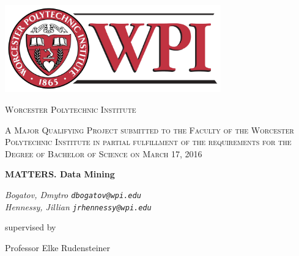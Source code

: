 \begin{titlepage}
	\centering
	
    \includegraphics[width=0.7\textwidth]{images/wpiLogo.png}\par\vspace{0.5cm}
	
    {\scshape\Large Worcester Polytechnic Institute \par}
	\vspace{1cm}
	
    {\scshape\large
		A Major Qualifying Project submitted to the Faculty of the 
		Worcester Polytechnic Institute in partial fulfillment of 
		the requirements for the Degree of Bachelor of Science on March 17, 2016 
	\par}
	\vspace{1.25cm}
	
    {\LARGE\bfseries MATTERS. Data Mining \par}
	\vspace{1cm}
	
    {\large\itshape 
        Bogatov, Dmytro \texttt{dbogatov@wpi.edu} \\
        Hennessy, Jillian \texttt{jrhennessy@wpi.edu}
     \par}
	\vfill
	
    supervised by\par
	Professor Elke Rudensteiner

	\vfill
    
\end{titlepage}